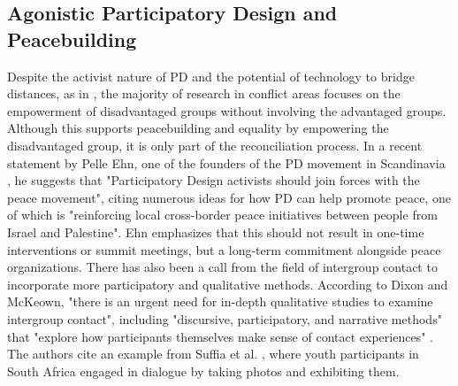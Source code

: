 \documentclass[dissertation,math,vertlayout,pdfa,colorlinks]{aaltoseries}
\begin{document}
\subsection{Agonistic Participatory Design and Peacebuilding}
Despite the activist nature of PD and the potential of technology to bridge distances, as in \cite{clarkeDecolonisingParticipatoryDesign2022}, the majority of research in conflict areas focuses on the empowerment of disadvantaged groups without involving the advantaged groups. Although this supports peacebuilding and equality by empowering the disadvantaged group, it is only part of the reconciliation process. In a recent statement by Pelle Ehn, one of the founders of the PD movement in Scandinavia \cite[p.293]{bodkerAfterthoughtsEmergentFuture2025}, he suggests that "Participatory Design activists should join forces with the peace movement", citing numerous ideas for how PD can help promote peace, one of which is "reinforcing local cross-border peace initiatives between people from Israel and Palestine". Ehn emphasizes that this should not result in one-time interventions or summit meetings, but a long-term commitment alongside peace organizations. There has also been a call from the field of intergroup contact to incorporate more participatory and qualitative methods. According to Dixon and McKeown, "there is an urgent need for in-depth qualitative studies to examine intergroup contact", including "discursive, participatory, and narrative methods" that "explore how participants themselves make sense of contact experiences" \cite{dixonNegativeContactCollective2021}. The authors cite an example from Suffia et al. \cite{sufflaPhotovoiceCommunityEngaged2012}, where youth participants in South Africa engaged in dialogue by taking photos and exhibiting them.
\end{document}
